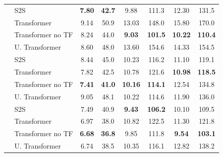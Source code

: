 {\begin{landscape}
\begin{table}[htbp]
\begin{tabular}{llcccccc}
					& S2S      			&  \textbf{7.80} & \textbf{42.7} &          9.88  &         111.3  &         12.30  &         131.5 	\\ %
					& Transformer       &          9.14  &         50.9  &         13.03  &         148.0  &         15.80  &         170.0 	\\ %
					& Transformer no TF &          8.24  &         44.0  &  \textbf{9.03} & \textbf{101.5} & \textbf{10.22} & \textbf{110.4}  	\\ %
					& U. Transformer    &          8.60  &         48.0  &         13.60  &         154.6  &         14.33  &         154.5 	\\ %
					
					& S2S      			&          8.44  &         45.0  &         10.23  &         116.2  &         11.10  &         119.1 	\\ %
					& Transformer       &          7.82  &         42.5  &         10.78  &         121.6  & \textbf{10.98} & \textbf{118.5}	\\ %
					& Transformer no TF &  \textbf{7.41} & \textbf{41.0} & \textbf{10.16} & \textbf{114.1} &         12.54  &         134.8  	\\ %
					& U. Transformer    &          9.05  &         48.1  &         10.22  &         114.6  &         11.90  &         136.0 	\\ %
					
					& S2S      			&          7.49  &         40.9  &  \textbf{9.43} & \textbf{106.2} &         10.10  &         109.5 	\\ %
					& Transformer       &          6.97  &         38.0  &         10.82  &         122.5  &         11.30  &         121.8 	\\ %
					& Transformer no TF &  \textbf{6.68} & \textbf{36.8} &          9.85  &         111.8  &  \textbf{9.54} & \textbf{103.1} 	\\ %
					& U. Transformer    &          6.74  &         38.5  &         10.35  &         116.1  &         12.82  &         138.2 	\\ %
					

\end{tabular}
\end{table}
\end{landscape}}
